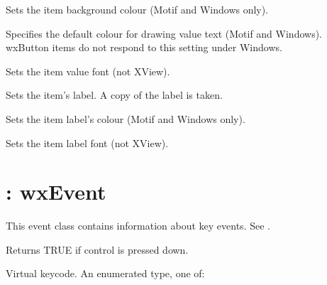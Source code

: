 

Sets the item background colour (Motif and Windows only).



Specifies the default colour for drawing value text (Motif and Windows).
wxButton items do not respond to this setting under Windows.



Sets the item value font (not XView).



Sets the item's label. A copy of the label is taken.



Sets the item label's colour (Motif and Windows only).



Sets the item label font (not XView).

\section{: wxEvent}\label{wxkeyevent}

This event class contains information about key events. See .



Returns TRUE if control is pressed down.



Virtual keycode. An enumerated type, one of:

